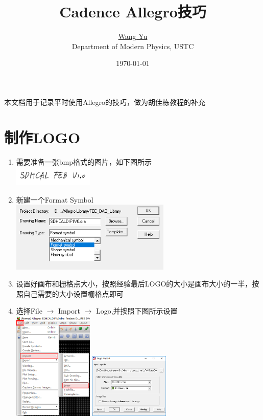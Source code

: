 \documentclass[a4paper,twoside]{article}
\title{Cadence Allegro技巧}
\author{\href{mailto:wyu0831@hotmail.com}{Wang Yu}\\ Department of Modern Physics, USTC}
\date{\today}
\begin{document}
\maketitle


本文档用于记录平时使用Allegro的技巧，做为胡佳栋教程的补充
\clearpage
\tableofcontents
\clearpage
\section{制作LOGO}
	\begin{enumerate}
		\item 需要准备一张bmp格式的图片，如下图所示 \\ \includegraphics[width=0.3\textwidth]{figures/SDHCALFEB1V0.png}
		\item 新建一个Format Symbol \\ \includegraphics[width=0.6\textwidth]{figures/CreateFormatSymbol.png}
		\item 设置好画布和栅格点大小，按照经验最后LOGO的大小是画布大小的一半，按照自己需要的大小设置栅格点即可
		\item 选择File $\rightarrow$ Import $\rightarrow$ Logo,并按照下图所示设置 \\ \includegraphics[width= 0.3\textwidth]{figures/FileImportLogo.png} \includegraphics[width=0.3\textwidth]{figures/LogoImport.png}

\end{enumerate}
\end{document}
